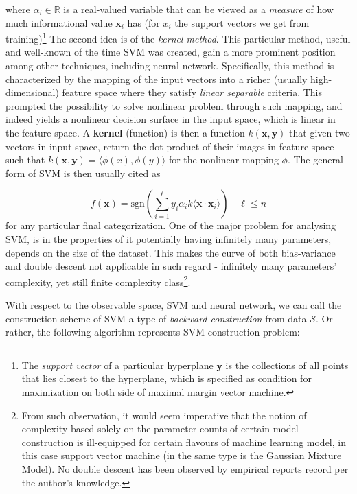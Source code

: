 \documentclass[
  journal=largetwo,
  year=2025,
  volume=37,
]{cup-journal}
\begin{document}
where $\alpha_{i}\in \mathbb{R}$ is a real-valued variable that can be viewed as a \textit{measure} of how much informational value $\mathbf{x}_{i}$ has (for $x_{i}$ the support vectors we get from training)\footnote{The \textit{support vector} of a particular hyperplane $\mathbf{y}$ is the collections of all points that lies closest to the hyperplane, which is specified as condition for maximization on both side of maximal margin vector machine.} The second idea is of the \textit{kernel method}. This particular method, useful and well-known of the time SVM was created, gain a more prominent position among other techniques, including neural network. Specifically, this method is characterized by the mapping of the input vectors into a richer (usually high-dimensional) feature space where they satisfy \textit{linear separable} criteria. This prompted the possibility to solve nonlinear problem through such mapping, and indeed yields a nonlinear decision surface in the input space, which is linear in the feature space. A \textbf{kernel} (function) is then a function $k(\mathbf{x},\mathbf{y})$ that given two vectors in input space, return the dot product of their images in feature space such that $k(\mathbf{x},\mathbf{y})=\langle \phi(x), \phi(y) \rangle$ for the nonlinear mapping $\phi$. The general form of SVM is then usually cited as 

\begin{equation}
    f(\mathbf{x}) = \mathrm{sgn} \left(\sum^{\ell}_{i=1} y_{i}\alpha_{i}k\langle \mathbf{x}\cdot \mathbf{x}_{i} \rangle\right)\quad \ell \leq n
\end{equation}
for any particular final categorization. One of the major problem for analysing SVM, is in the properties of it potentially having infinitely many parameters, depends on the size of the dataset. This makes the curve of both bias-variance and double descent not applicable in such regard - infinitely many parameters' complexity, yet still finite complexity class\footnote{From such observation, it would seem imperative that the notion of complexity based solely on the parameter counts of certain model construction is ill-equipped for certain flavours of machine learning model, in this case support vector machine (in the same type is the Gaussian Mixture Model). No double descent has been observed by empirical reports record per the author's knowledge.}. 

With respect to the observable space, SVM and neural network, we can call the construction scheme of SVM a type of \textit{backward construction} from data $\mathcal{S}$. Or rather, the following algorithm represents SVM construction problem: 
\end{document}
